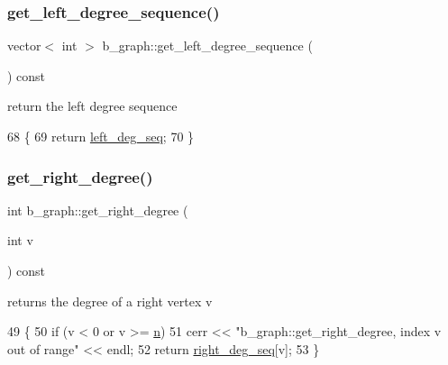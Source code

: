 \subsubsection{\texorpdfstring{get\+\_\+left\+\_\+degree\+\_\+sequence()}{get\_left\_degree\_sequence()}}
{\footnotesize\ttfamily vector$<$ int $>$ b\+\_\+graph\+::get\+\_\+left\+\_\+degree\+\_\+sequence (\begin{DoxyParamCaption}{ }\end{DoxyParamCaption}) const}



return the left degree sequence 


\begin{DoxyCode}
68 \{
69   \textcolor{keywordflow}{return} \hyperlink{classb__graph_a311d16462dbb10c47b3a6c80a42139d9}{left\_deg\_seq};
70 \}
\end{DoxyCode}
\mbox{\label{classb__graph_a1caf2e1ca8ee19e7407f489be6b171b8}} 
\subsubsection{\texorpdfstring{get\+\_\+right\+\_\+degree()}{get\_right\_degree()}}
{\footnotesize\ttfamily int b\+\_\+graph\+::get\+\_\+right\+\_\+degree (\begin{DoxyParamCaption}\item[{int}]{v }\end{DoxyParamCaption}) const}



returns the degree of a right vertex v 


\begin{DoxyCode}
49 \{
50   \textcolor{keywordflow}{if} (v < 0 or v >= \hyperlink{classb__graph_a9e211d40c1799bc9b125de472ff06642}{n})
51     cerr << \textcolor{stringliteral}{"b\_graph::get\_right\_degree, index v out of range"} << endl;
52   \textcolor{keywordflow}{return} \hyperlink{classb__graph_ae4c875ed6a583a78f38dfe958f20fad5}{right\_deg\_seq}[v];
53 \}
\end{DoxyCode}
\mbox{\label{classb__graph_a2711566385b92b02f4c03abdc1f9a582}} 
